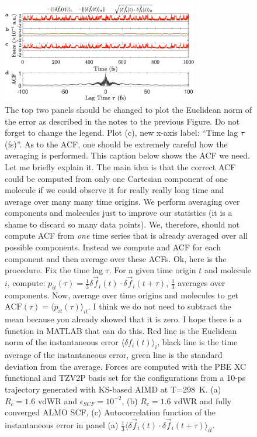 \documentclass[aps,prl,reprint,amsmath,amssymb]{revtex4-1}
\begin{document}
\begin{figure}
\includegraphics[trim={0.5cm 0cm 0.7cm 0.1cm},clip,width=8.6cm]{DeltaForceComparison_with_ACF.eps}
\caption{\label{fig:randomforce} {\color{red} The top two panels should be changed to plot the Euclidean norm of the error as described in the notes to the previous Figure. Do not forget to change the legend. Plot (c), new x-axis label: ``Time lag $\tau$ (fs)''. As to the ACF, one should be extremely careful how the averaging is performed. This caption below shows the ACF we need. Let me briefly explain it. The main idea is that the correct ACF could be computed from only one Cartesian component of one molecule if we could observe it for really really long time and average over many many time origins. We perform averaging over components and molecules just to improve our statistics (it is a shame to discard so many data points). We, therefore, should not compute ACF from \emph{one} time series that is already averaged over all possible components. Instead we compute and ACF for each component and then average over these ACFs. Ok, here is the procedure. Fix the time lag $\tau$. For a given time origin $t$ and molecule $i$, compute: $p_{it}(\tau)=\frac{1}{3}\delta \vec{f}_i (t)\cdot \delta \vec{f}_i (t+\tau)$, $\frac{1}{3}$ averages over components. Now, average over time origins and molecules to get $\text{ACF}(\tau) = \langle p_{it}(\tau) \rangle_{it}$. I think we do not need to subtract the mean because you already showed that it is zero. I hope there is a function in MATLAB that can do this.} 
Red line is the Euclidean norm of the instantaneous error $\langle \delta f_i(t) \rangle_i$, black line is the time average of the instantaneous error, green line is the standard deviation from the average. Forces are computed with the PBE XC functional and TZV2P basis set for the configurations from a 10-ps trajectory generated with KS-based AIMD at T=298~K. 
(a) $R_{c} = 1.6$ vdWR and $\epsilon_{SCF} = 10^{-2}$, 
(b) $R_{c} = 1.6$ vdWR and fully converged ALMO SCF,
(c) Autocorrelation function of the instantaneous error in panel (a) $\frac{1}{3}\langle \delta \vec{f}_i (t) \cdot \delta\vec{f}_i(t+\tau) \rangle_{it} $.
}
\end{figure}
\end{document}
